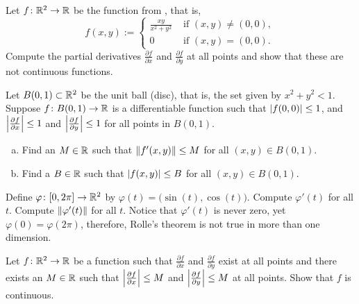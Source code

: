 \begin{exercise}
Let $f \colon {\mathbb{R}}^2 \to {\mathbb{R}}$ be the function from
, that is,
\begin{equation*}
f(x,y)
:=
\begin{cases}
\frac{xy}{x^2+y^2} & \text{ if $(x,y) \not= (0,0)$}, \\
0 & \text{ if $(x,y) = (0,0)$}.
\end{cases}
\end{equation*}
Compute the partial derivatives 
$\frac{\partial f}{\partial x}$ and
$\frac{\partial f}{\partial y}$ at all points and show that these are not
continuous functions.
\end{exercise}

\begin{exercise}
Let $B(0,1) \subset {\mathbb{R}}^2$ be the unit ball (disc), that is, the set given by
$x^2 + y^2 < 1$.
Suppose $f \colon B(0,1) \to {\mathbb{R}}$ is a differentiable function
such that $\lvert {f(0,0)} \rvert \leq 1$,
and 
$\left\lvert {\frac{\partial f}{\partial x}} \right\rvert \leq 1$ and
$\left\lvert {\frac{\partial f}{\partial y}} \right\rvert \leq 1$ for all
points in $B(0,1)$.
\begin{enumerate}[a)]
\item
Find an $M \in {\mathbb{R}}$ such that $\lVert {f'(x,y)} \rVert \leq M$
for all $(x,y) \in
B(0,1)$.
\item
Find a $B \in {\mathbb{R}}$ such that
$\lvert {f(x,y)} \rvert \leq B$
for all $(x,y) \in
B(0,1)$.
\end{enumerate}
\end{exercise}

\begin{exercise}
Define $\varphi \colon [0,2\pi] \to {\mathbb{R}}^2$ by $\varphi(t) =
\bigl(\sin(t),\cos(t)\bigr)$.  Compute $\varphi'(t)$ for all $t$.  Compute
$\lVert {\varphi'(t)} \rVert$ for all $t$.  Notice that $\varphi'(t)$ is never zero,
yet $\varphi(0) = \varphi(2\pi)$, therefore, Rolle's theorem is not true
in more than one dimension.
\end{exercise}

\begin{exercise}
Let $f \colon {\mathbb{R}}^2 \to {\mathbb{R}}$ be a function such that
$\frac{\partial f}{\partial x}$ and
$\frac{\partial f}{\partial y}$ exist at all points and there exists an $M
\in {\mathbb{R}}$
such that 
$\left\lvert {\frac{\partial f}{\partial x}} \right\rvert \leq M$ and
$\left\lvert {\frac{\partial f}{\partial y}} \right\rvert \leq M$ at all points.  Show that $f$
is continuous.
\end{exercise}

